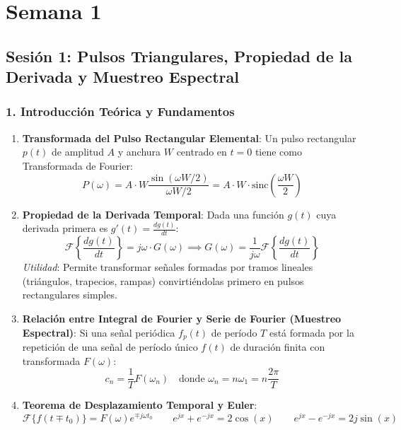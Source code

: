 \chapter{Semana 1}
\section{Sesión 1: Pulsos Triangulares, Propiedad de la Derivada y Muestreo Espectral}

\subsection*{1. Introducción Teórica y Fundamentos}

\begin{tcolorbox}[cajaResumen, title={Conceptos Clave para la Resolución de Ejercicios}]
\begin{enumerate}[leftmargin=*]
    \item \textbf{Transformada del Pulso Rectangular Elemental}:
    Un pulso rectangular $p(t)$ de amplitud $A$ y anchura $W$ centrado en $t=0$ tiene como Transformada de Fourier:
    \[
    P(\omega) = A \cdot W \frac{\sin(\omega W / 2)}{\omega W / 2} = A \cdot W \cdot \text{sinc}\left(\frac{\omega W}{2}\right)
    \]

    \item \textbf{Propiedad de la Derivada Temporal}:
    Dada una función $g(t)$ cuya derivada primera es $g'(t) = \frac{dg(t)}{dt}$:
    \[
    \mathcal{F}\left\{ \frac{dg(t)}{dt} \right\} = j\omega \cdot G(\omega) \implies G(\omega) = \frac{1}{j\omega} \mathcal{F}\left\{ \frac{dg(t)}{dt} \right\}
    \]
    \textit{Utilidad}: Permite transformar señales formadas por tramos lineales (triángulos, trapecios, rampas) convirtiéndolas primero en pulsos rectangulares simples.

    \item \textbf{Relación entre Integral de Fourier y Serie de Fourier (Muestreo Espectral)}:
    Si una señal periódica $f_p(t)$ de período $T$ está formada por la repetición de una señal de período único $f(t)$ de duración finita con transformada $F(\omega)$:
    \[
    c_n = \frac{1}{T} F(\omega_n) \quad \text{donde } \omega_n = n \omega_1 = n \frac{2\pi}{T}
    \]

    \item \textbf{Teorema de Desplazamiento Temporal y Euler}:
    \[
    \mathcal{F}\{f(t \mp t_0)\} = F(\omega) e^{\mp j\omega t_0} \qquad e^{jx} + e^{-jx} = 2\cos(x) \qquad e^{jx} - e^{-jx} = 2j\sin(x)
    \]
\end{enumerate}
\end{tcolorbox}

